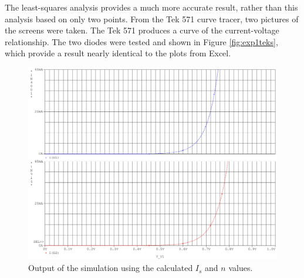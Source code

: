 \documentclass{report}
\begin{document}
The least-squares analysis provides a much more accurate result, rather than this analysis based on only two points. From the Tek 571 curve tracer, two pictures of the screens were taken. The Tek 571 produces a curve of the current-voltage relationship. The two diodes were tested and shown in Figure \ref{fig:exp1teks}, which provide a result nearly identical to the plots from Excel.

\begin{figure}[H]
	\centering
	\includegraphics[width=1.0\linewidth]{exp1postsimcombined}
	\caption{Output of the simulation using the calculated $I_s$ and $n$ values.}
	\label{fig:exp1postsim}
\end{figure}
\end{document}
